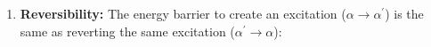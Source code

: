 \begin{frame}
\begin{enumerate}
{    }
    \item<5-> \textbf{Reversibility:} The energy barrier to create an excitation ($\alpha \to \alpha^\prime$) is the same as reverting the same excitation ($\alpha^\prime \to \alpha$):
    
\end{enumerate}



\end{frame}
